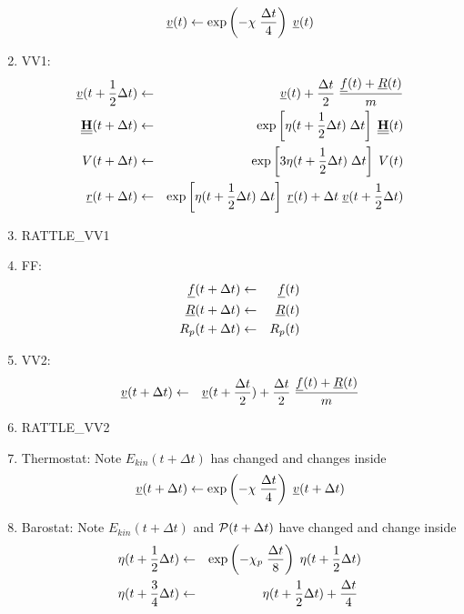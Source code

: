 \begin{enumerate}
\begin{equation}
\mbox{$\underline{v}$}(t) \leftarrow \exp \left( -\chi \; {\Delta t \over 4} \right) \; \mbox{$\underline{v}$}(t)
\end{equation}
\item VV1:
\begin{eqnarray}
\mbox{$\underline{v}$}(t + {1 \over 2} \Delta t) &\leftarrow& \mbox{$\underline{v}$}(t) +
{\Delta t \over 2} \; \frac{\mbox{$\underline{f}$}(t)+\mbox{$\underline{R}$}(t)}{m} \nonumber \\
\mbox{$\underline{\underline{\bf H}}$}(t + \Delta t) &\leftarrow& \exp \left[
\eta (t + {1 \over 2} \Delta t) \; \Delta t \right] \; \mbox{$\underline{\underline{\bf H}}$}(t) \nonumber \\
V(t + \Delta t) &\leftarrow& \exp \left[3 \eta (t + {1 \over 2} \Delta t) \;
\Delta t \right] \; V(t) \\
\mbox{$\underline{r}$}(t + \Delta t) &\leftarrow& \exp \left[ \eta (t + {1 \over 2} \Delta t) \; \Delta t \right] \;
\mbox{$\underline{r}$}(t) + \Delta t \; \mbox{$\underline{v}$}(t + {1 \over 2} \Delta t) \nonumber
\end{eqnarray}
\item RATTLE\_VV1
\item FF:
\begin{eqnarray}
\mbox{$\underline{f}$}(t + \Delta t) &\leftarrow& \mbox{$\underline{f}$}(t) \nonumber \\
\mbox{$\underline{R}$}(t + \Delta t) &\leftarrow& \mbox{$\underline{R}$}(t) \\
R_{p} (t + \Delta t) &\leftarrow& R_{p} (t) \nonumber
\end{eqnarray}
\item VV2:
\begin{eqnarray}
\mbox{$\underline{v}$}(t + \Delta t) &\leftarrow& \mbox{$\underline{v}$}(t + {\Delta t \over 2}) +
{\Delta t \over 2} \; \frac{\mbox{$\underline{f}$}(t)+\mbox{$\underline{R}$}(t)}{m}
\end{eqnarray}
\item RATTLE\_VV2
\item Thermostat: Note $E_{kin}(t + \Delta t)$ has changed and changes inside
\begin{equation}
\mbox{$\underline{v}$}(t + \Delta t) \leftarrow \exp \left( -\chi \; {\Delta t \over 4} \right) \; \mbox{$\underline{v}$}(t + \Delta t)
\end{equation}
\item Barostat: Note $E_{kin}(t + \Delta t)$ and ${\cal P}(t + \Delta t)$
have changed and change inside
\begin{eqnarray}
\eta (t + {1 \over 2} \Delta t) &\leftarrow& \exp \left( -\chi_{p} \; {\Delta t \over 8} \right) \;
\eta (t + {1 \over 2} \Delta t) \nonumber \\
\eta (t + {3 \over 4} \Delta t) &\leftarrow& \eta (t + {1 \over 2} \Delta t) + {\Delta t \over 4} \;

\end{eqnarray}
\end{enumerate}
